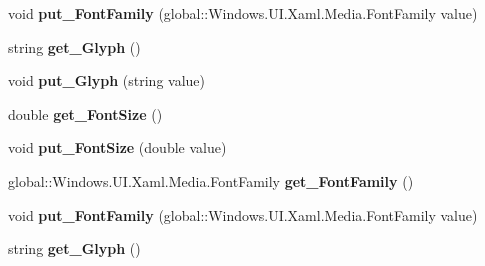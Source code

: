 \begin{DoxyCompactItemize}
void {\bfseries put\+\_\+\+Font\+Family} (global\+::\+Windows.\+U\+I.\+Xaml.\+Media.\+Font\+Family value)
\item 
\mbox{\label{interface_windows_1_1_u_i_1_1_xaml_1_1_controls_1_1_i_font_icon_a7b89ee1452fbf6add71574383ec042ad}} 
string {\bfseries get\+\_\+\+Glyph} ()
\item 
\mbox{\label{interface_windows_1_1_u_i_1_1_xaml_1_1_controls_1_1_i_font_icon_a286f89cdc8e53df9aaa1bcae6107ea9f}} 
void {\bfseries put\+\_\+\+Glyph} (string value)
\item 
\mbox{\label{interface_windows_1_1_u_i_1_1_xaml_1_1_controls_1_1_i_font_icon_ab38ce1dfd80b0b587d2104020f6af58f}} 
double {\bfseries get\+\_\+\+Font\+Size} ()
\item 
\mbox{\label{interface_windows_1_1_u_i_1_1_xaml_1_1_controls_1_1_i_font_icon_ae3677531a4f648e82404282b2852bf18}} 
void {\bfseries put\+\_\+\+Font\+Size} (double value)
\item 
\mbox{\label{interface_windows_1_1_u_i_1_1_xaml_1_1_controls_1_1_i_font_icon_a9a70a7f083b2528d375f3a8262aae382}} 
global\+::\+Windows.\+U\+I.\+Xaml.\+Media.\+Font\+Family {\bfseries get\+\_\+\+Font\+Family} ()
\item 
\mbox{\label{interface_windows_1_1_u_i_1_1_xaml_1_1_controls_1_1_i_font_icon_ac80bf98a4d031b00224048236e74f7a1}} 
void {\bfseries put\+\_\+\+Font\+Family} (global\+::\+Windows.\+U\+I.\+Xaml.\+Media.\+Font\+Family value)
\item 
\mbox{\label{interface_windows_1_1_u_i_1_1_xaml_1_1_controls_1_1_i_font_icon_a7b89ee1452fbf6add71574383ec042ad}} 
string {\bfseries get\+\_\+\+Glyph} ()
\item 
\mbox{\label{interface_windows_1_1_u_i_1_1_xaml_1_1_controls_1_1_i_font_icon_a286f89cdc8e53df9aaa1bcae6107ea9f}} 

\end{DoxyCompactItemize}
